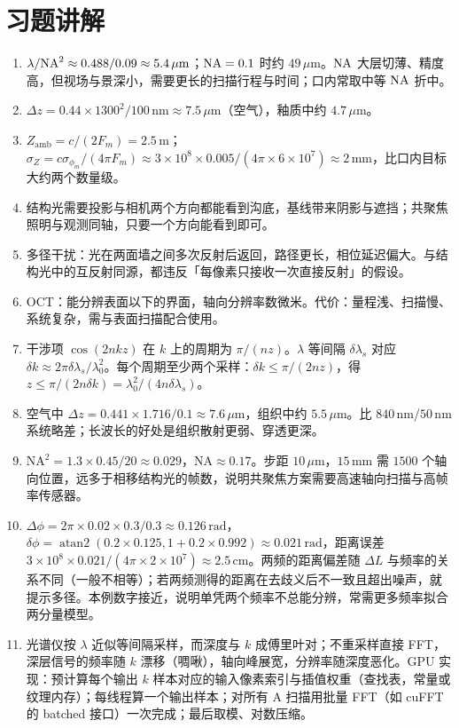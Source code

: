 \section{习题讲解}
\label{sec:ch09-solutions}

\begin{enumerate}
  \item $\lambda/\mathrm{NA}^2\approx0.488/0.09\approx5.4\,\mu\mathrm{m}$；$\mathrm{NA}=0.1$ 时约 $49\,\mu\mathrm{m}$。$\mathrm{NA}$ 大层切薄、精度高，但视场与景深小，需要更长的扫描行程与时间；口内常取中等 $\mathrm{NA}$ 折中。
  \item $\Delta z=0.44\times1300^2/100\,\mathrm{nm}\approx7.5\,\mu\mathrm{m}$（空气），釉质中约 $4.7\,\mu\mathrm{m}$。
  \item $Z_{\mathrm{amb}}=c/(2F_m)=2.5\,\mathrm{m}$；$\sigma_Z=c\sigma_{\phi_m}/(4\pi F_m)\approx3\times10^8\times0.005/(4\pi\times6\times10^7)\approx2\,\mathrm{mm}$，比口内目标大约两个数量级。
  \item 结构光需要投影与相机两个方向都能看到沟底，基线带来阴影与遮挡；共聚焦照明与观测同轴，只要一个方向能看到即可。
  \item 多径干扰：光在两面墙之间多次反射后返回，路径更长，相位延迟偏大。与结构光中的互反射同源，都违反「每像素只接收一次直接反射」的假设。
  \item OCT：能分辨表面以下的界面，轴向分辨率数微米。代价：量程浅、扫描慢、系统复杂，需与表面扫描配合使用。
  \item 干涉项 $\cos(2nkz)$ 在 $k$ 上的周期为 $\pi/(nz)$。$\lambda$ 等间隔 $\delta\lambda_s$ 对应 $\delta k\approx2\pi\delta\lambda_s/\lambda_0^2$。每个周期至少两个采样：$\delta k\le\pi/(2nz)$，得 $z\le\pi/(2n\delta k)=\lambda_0^2/(4n\delta\lambda_s)$。
  \item 空气中 $\Delta z=0.441\times1.716/0.1\approx7.6\,\mu\mathrm{m}$，组织中约 $5.5\,\mu\mathrm{m}$。比 $840\,\mathrm{nm}$/$50\,\mathrm{nm}$ 系统略差；长波长的好处是组织散射更弱、穿透更深。
  \item $\mathrm{NA}^2=1.3\times0.45/20\approx0.029$，$\mathrm{NA}\approx0.17$。步距 $10\,\mu\mathrm{m}$，$15\,\mathrm{mm}$ 需 $1500$ 个轴向位置，远多于相移结构光的帧数，说明共聚焦方案需要高速轴向扫描与高帧率传感器。
  \item $\Delta\phi=2\pi\times0.02\times0.3/0.3\approx0.126\,\mathrm{rad}$，$\delta\phi=\operatorname{atan2}(0.2\times0.125,1+0.2\times0.992)\approx0.021\,\mathrm{rad}$，距离误差 $3\times10^8\times0.021/(4\pi\times2\times10^7)\approx2.5\,\mathrm{cm}$。两频的距离偏差随 $\Delta L$ 与频率的关系不同（一般不相等）；若两频测得的距离在去歧义后不一致且超出噪声，就提示多径。本例数字接近，说明单凭两个频率不总能分辨，常需更多频率拟合两分量模型。
  \item 光谱仪按 $\lambda$ 近似等间隔采样，而深度与 $k$ 成傅里叶对；不重采样直接 FFT，深层信号的频率随 $k$ 漂移（啁啾），轴向峰展宽，分辨率随深度恶化。GPU 实现：预计算每个输出 $k$ 样本对应的输入像素索引与插值权重（查找表，常量或纹理内存）；每线程算一个输出样本；对所有 A 扫描用批量 FFT（如 cuFFT 的 batched 接口）一次完成；最后取模、对数压缩。
\end{enumerate}
